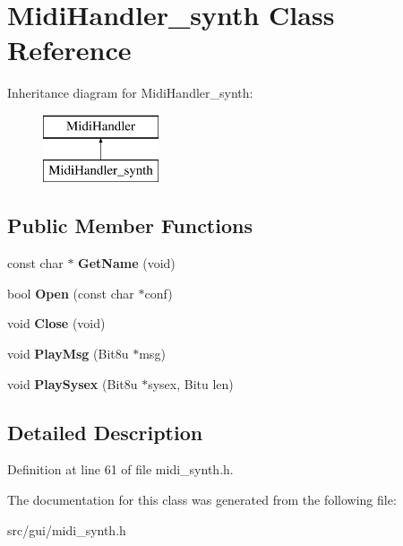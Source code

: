 \hypertarget{classMidiHandler__synth}{\section{Midi\-Handler\-\_\-synth Class Reference}
\label{classMidiHandler__synth}
}
Inheritance diagram for Midi\-Handler\-\_\-synth\-:\begin{figure}[H]
\begin{center}
\leavevmode
\includegraphics[height=2.000000cm]{classMidiHandler__synth}
\end{center}
\end{figure}
\subsection*{Public Member Functions}
\begin{DoxyCompactItemize}
\item 
\hypertarget{classMidiHandler__synth_a454a33652eaf4a99349caf378de56de0}{const char $\ast$ {\bfseries Get\-Name} (void)}\label{classMidiHandler__synth_a454a33652eaf4a99349caf378de56de0}

\item 
\hypertarget{classMidiHandler__synth_a026ce32cbfcb35586e6e6319a375f9ae}{bool {\bfseries Open} (const char $\ast$conf)}\label{classMidiHandler__synth_a026ce32cbfcb35586e6e6319a375f9ae}

\item 
\hypertarget{classMidiHandler__synth_ab73be86b44941f696b08a8eb2a4528e8}{void {\bfseries Close} (void)}\label{classMidiHandler__synth_ab73be86b44941f696b08a8eb2a4528e8}

\item 
\hypertarget{classMidiHandler__synth_afd4de648ae2becfbda22248e30856634}{void {\bfseries Play\-Msg} (Bit8u $\ast$msg)}\label{classMidiHandler__synth_afd4de648ae2becfbda22248e30856634}

\item 
\hypertarget{classMidiHandler__synth_a9f912eb5d21109f9b42c8a4b70d0544f}{void {\bfseries Play\-Sysex} (Bit8u $\ast$sysex, Bitu len)}\label{classMidiHandler__synth_a9f912eb5d21109f9b42c8a4b70d0544f}

\end{DoxyCompactItemize}


\subsection{Detailed Description}


Definition at line 61 of file midi\-\_\-synth.\-h.



The documentation for this class was generated from the following file\-:\begin{DoxyCompactItemize}
\item 
src/gui/midi\-\_\-synth.\-h\end{DoxyCompactItemize}
